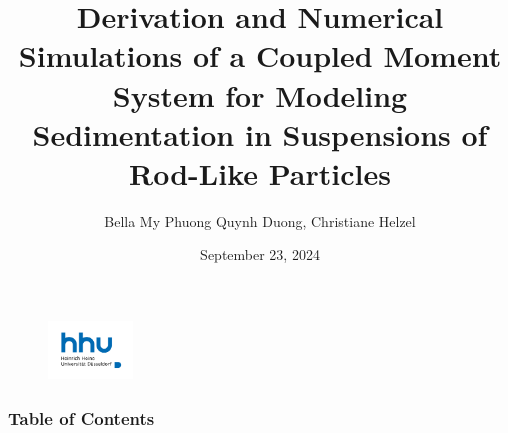 \documentclass[lightblue, notheorems, xcolor=dvipsnames]{beamer}
\theoremstyle{definition}
\theoremstyle{plain}
\theoremstyle{example}
\begin{document}
  \author{Bella My Phuong Quynh Duong, Christiane Helzel}
  \date{September 23, 2024} %
  \title{Derivation and Numerical Simulations of a Coupled Moment System for Modeling Sedimentation in Suspensions of Rod-Like Particles}
  
  \begin{frame}
  	\titlepage
  	\begin{figure}[htpb]
  		\begin{center}
  			\includegraphics[width=0.2\textwidth]{logo.png}
  		\end{center}
  	\end{figure}
  \end{frame}
\begin{frame}
   \frametitle{Table of Contents}
\tableofcontents %
\end{frame}

\end{document}
